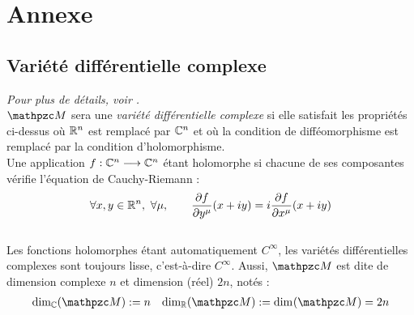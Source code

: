 \section{Annexe}

\subsection{\wip Variété différentielle complexe }\label{ann:VDC}

\textit{Pour plus de détails, voir \cite{nakahara_geometry_2003, ballmann_lectures_2006}.}
\\

$\manu$ sera une \emph{variété différentielle complexe} si elle satisfait les propriétés ci-dessus où $\mathbb{R}^n$ est remplacé par $\mathbb{C}^n$ et où la condition de difféomorphisme est remplacé par la condition d'holomorphisme. 
\\
Une application $f : \mathbb{C}^n\longrightarrow \mathbb{C}^n$ étant holomorphe si chacune de ses composantes vérifie l'équation de Cauchy-Riemann :
\[\forall x,y\in\R^n,\ \forall \mu,\qquad \frac{\partial f }{\partial y^\mu}(x+iy) = i \frac{\partial f }{\partial x^\mu}(x+iy)\]
\\
Les fonctions holomorphes étant automatiquement $C^\infty$, les variétés différentielles complexes sont toujours lisse, c'est-à-dire $C^\infty$. Aussi, $\manu$ est dite de dimension complexe $n$ et dimension (réel) $2n$, notés :
\begin{align}\label{eq:manuC-base_cano}
	\dim[\C](\manu) &\defeq n  &  \dim[\R] (\manu) \defeq \dim (\manu) = 2n
\end{align}
\\

